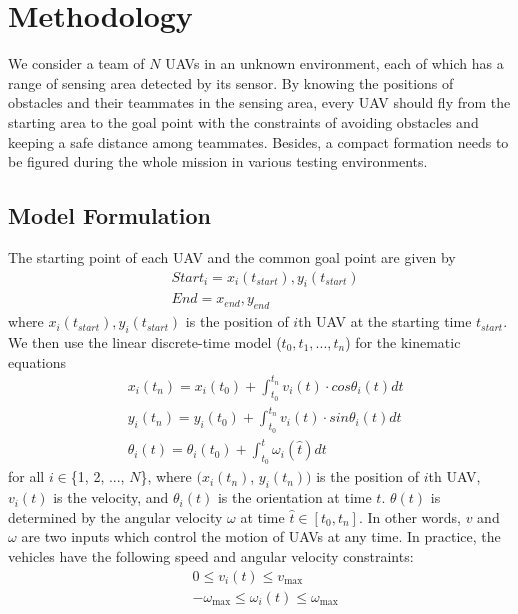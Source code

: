 \chapter{Methodology}
We consider a team of $N$ UAVs in an unknown environment, each of which has a range of sensing area detected by its sensor. By knowing the positions of obstacles and their teammates in the sensing area, every UAV should fly from the starting area to the goal point with the constraints of avoiding obstacles and keeping a safe distance among teammates. Besides, a compact formation needs to be figured during the whole mission in various testing environments.

\section{Model Formulation}

The starting point of each UAV and the common goal point are given by
\begin{equation}
\begin{aligned}
& Start_{i} = x_{i}(t_{start}),  y_{i}(t_{start}) \\
& End = x_{end},  y_{end}
\end{aligned}
\end{equation}
where $x_{i}(t_{start}), y_{i}(t_{start})$ is the position of $i$th UAV at the starting time $t_{start}$. We then use the linear discrete-time model ($t_{0}, t_{1}, ..., t_{n}$) for the kinematic equations
\begin{equation} 
\begin{aligned}
& x_{i}(t_{n}) = x_{i}(t_{0}) + \int_{t_{0}}^{t_{n}} v_{i}(t) \cdot cos\theta_{i}(t)dt \\
& y_{i}(t_{n}) = y_{i}(t_{0}) + \int_{t_{0}}^{t_{n}} v_{i}(t) \cdot sin\theta_{i}(t)dt \\
& \theta_{i}(t) = \theta_{i}(t_{0}) + \int_{t_{0}}^{t} \omega_{i}(\hat{t})dt
\end{aligned}
\end{equation}
for all $i\in$\{1, 2, ..., $N$\}, where $(x_{i}(t_{n})$, $y_{i}(t_{n}))$ is the position of $i$th UAV, $v_{i}(t)$ is the velocity, and $\theta_{i}(t)$ is the orientation at time $t$. $\theta(t)$ is determined by the angular velocity $\omega$ at time $\hat{t}\in[t_{0}, t_{n}]$. In other words, $v$ and $\omega$ are two inputs which control the motion of UAVs at any time. In practice, the vehicles have the following speed and angular velocity constraints: 
\begin{equation} 
\begin{aligned}
& 0\leq v_{i}(t)\leq v_{\max}\\
& -\omega_{\max}\leq\omega_{i}(t)\leq\omega_{\max}
\label{eqn:bound}
\end{aligned}
\end{equation}

